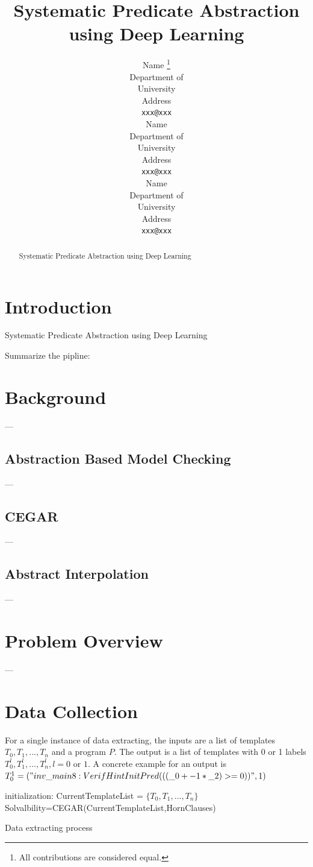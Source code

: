 \documentclass{article}
\title{Systematic Predicate Abstraction using Deep Learning}
\author{
  Name \thanks{All contributions are considered equal.}\\
  Department of \\
   University\\
  Address \\
  \texttt{xxx@xxx} \\
   \And
 Name \samethanks\\
  Department of \\
   University\\
  Address \\
  \texttt{xxx@xxx} \\
     \And
 Name \samethanks\\
  Department of \\
   University\\
  Address \\
  \texttt{xxx@xxx} \\
}
\begin{document}
\maketitle

\begin{abstract}
Systematic Predicate Abstraction using Deep Learning
\end{abstract}




\section{Introduction}
Systematic Predicate Abstraction using Deep Learning

Summarize the pipline: 

\section{Background}
---
\subsection{Abstraction Based Model Checking}
---
\subsection{CEGAR}
---
\subsection{Abstract Interpolation}
---
\section{Problem Overview}
---

\section{Data Collection}
For a single instance of data extracting, the inputs are a list of templates $T_{0},T_{1},...,T_{n}$ and a program $P$. The output is a list of templates with 0 or 1 labels $T_{0}^{l},T_{1}^{l},...,T_{n}^{l}, l= 0$ or $1$. A concrete example for an output is $T_{0}^{1} = ("inv\_main8:VerifHintInitPred(((\_0 + -1 * \_2) >= 0))",1)$

\begin{algorithm}[H]
\SetAlgoLined
{}
 initialization:  CurrentTemplateList = $\{T_{0},T_{1},...,T_{n}\}$\;
 Solvalbility=CEGAR(CurrentTemplateList,HornClauses)\;
 \caption{Data extracting process}
\end{algorithm}
\end{document}

